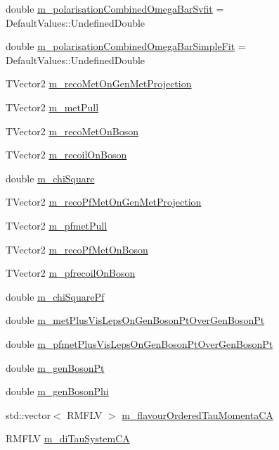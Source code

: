 \begin{DoxyCompactItemize}
double \hyperlink{classHttProduct_a76ad97fa61bb687121369e7eefd46836}{m\_\-polarisationCombinedOmegaBarSvfit} = DefaultValues::UndefinedDouble
\item 
double \hyperlink{classHttProduct_a9dfb25a74bfaf26ad2c4da1fee5f7572}{m\_\-polarisationCombinedOmegaBarSimpleFit} = DefaultValues::UndefinedDouble
\item 
TVector2 \hyperlink{classHttProduct_a9452803893bd2284d830ff46f52f606b}{m\_\-recoMetOnGenMetProjection}
\item 
TVector2 \hyperlink{classHttProduct_a9cad0f70398e40cc1b27bbbb5ca3f25b}{m\_\-metPull}
\item 
TVector2 \hyperlink{classHttProduct_abeb2d8eb1b290b609a225cef8616d021}{m\_\-recoMetOnBoson}
\item 
TVector2 \hyperlink{classHttProduct_ab2b4e95415346741761baf7a260e9d07}{m\_\-recoilOnBoson}
\item 
double \hyperlink{classHttProduct_a5cd0d8131990b751fa9c37148267a82f}{m\_\-chiSquare}
\item 
TVector2 \hyperlink{classHttProduct_a14c6dc367cae8ab8dfec16d20180cd8d}{m\_\-recoPfMetOnGenMetProjection}
\item 
TVector2 \hyperlink{classHttProduct_af0871f430337a0e9afd9142e2c685332}{m\_\-pfmetPull}
\item 
TVector2 \hyperlink{classHttProduct_abea8bb6a2a1f310bffeeed4e3c1828e9}{m\_\-recoPfMetOnBoson}
\item 
TVector2 \hyperlink{classHttProduct_ac875645551f9928222a8f22f2487b444}{m\_\-pfrecoilOnBoson}
\item 
double \hyperlink{classHttProduct_a662eecf0d76a57e4dc516b9acef7fb6a}{m\_\-chiSquarePf}
\item 
double \hyperlink{classHttProduct_aff2a9293122d9236decdc9ee37d16916}{m\_\-metPlusVisLepsOnGenBosonPtOverGenBosonPt}
\item 
double \hyperlink{classHttProduct_ae3ef7216b4923322f5f2bae4e4631691}{m\_\-pfmetPlusVisLepsOnGenBosonPtOverGenBosonPt}
\item 
double \hyperlink{classHttProduct_af396cb9db5d26bff1fc6950b75fe8a69}{m\_\-genBosonPt}
\item 
double \hyperlink{classHttProduct_aebef7da9d392e74d5a2f9ed5ccbc1b0e}{m\_\-genBosonPhi}
\item 
std::vector$<$ RMFLV $>$ \hyperlink{classHttProduct_a052e584fa560589e8b47cff8675827e4}{m\_\-flavourOrderedTauMomentaCA}
\item 
RMFLV \hyperlink{classHttProduct_a1a670963cdd4350b7abc851b0b69366e}{m\_\-diTauSystemCA}

\end{DoxyCompactItemize}
